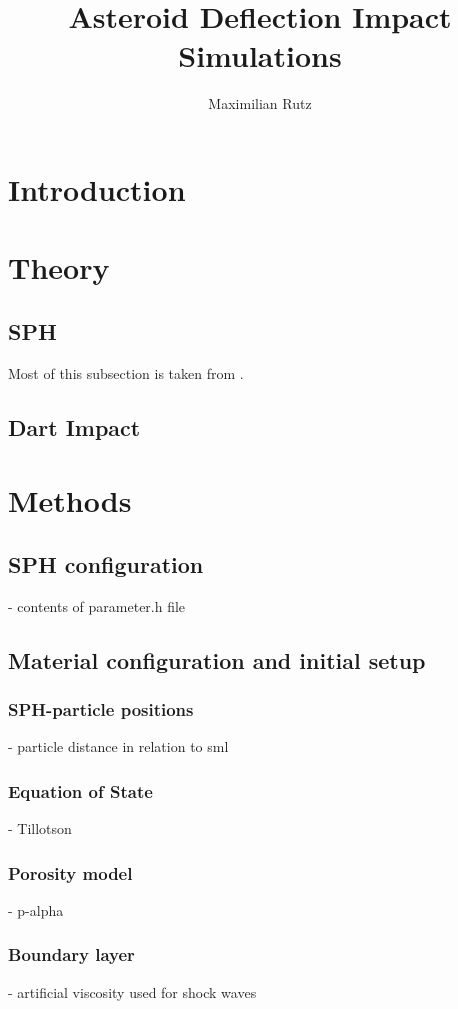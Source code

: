 \documentclass{article}
\title{Asteroid Deflection Impact Simulations}
\author{Maximilian Rutz}
\date{}
\begin{document}
	\maketitle
	\begin{abstract}
	 
	\end{abstract}
	
	\newpage
	\tableofcontents
	 
	\newpage
	\section{Introduction} 
	\section{Theory}
		\subsection{SPH}
			Most of this subsection is taken from \cite{Jutzi_p_alpha_1}.	
		\subsection{Dart Impact}
	\section{Methods}
		\subsection{SPH configuration}
		- contents of parameter.h file
		\subsection{Material configuration and initial setup}
			\subsubsection{SPH-particle positions}
			- particle distance in relation to sml
			\subsubsection{Equation of State}
			- Tillotson
			\subsubsection{Porosity model}	
			- p-alpha		
			\subsubsection{Boundary layer}
			- artificial viscosity used for shock waves			
\end{document}
